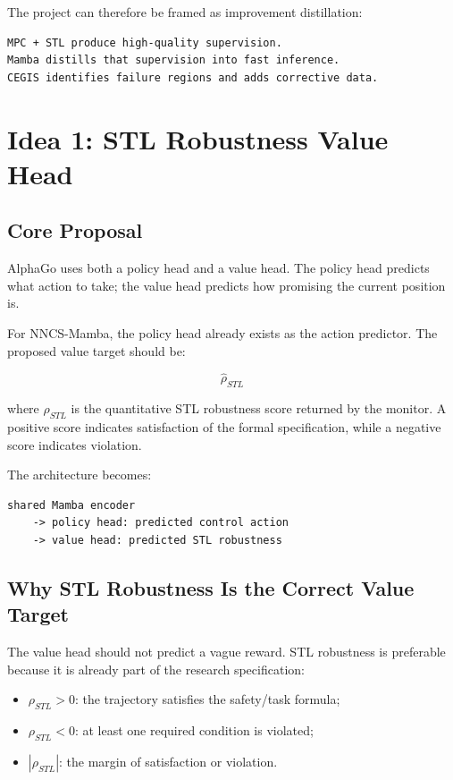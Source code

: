 \documentclass[11pt]{article}
\begin{document}
The project can therefore be framed as improvement distillation:

\begin{lstlisting}
MPC + STL produce high-quality supervision.
Mamba distills that supervision into fast inference.
CEGIS identifies failure regions and adds corrective data.
\end{lstlisting}

\section{Idea 1: STL Robustness Value Head}

\subsection{Core Proposal}

AlphaGo uses both a policy head and a value head. The policy head predicts what action to take; the value head predicts how promising the current position is.

For NNCS-Mamba, the policy head already exists as the action predictor. The proposed value target should be:

\[
\hat{\rho}_{STL}
\]

where \(\rho_{STL}\) is the quantitative STL robustness score returned by the monitor. A positive score indicates satisfaction of the formal specification, while a negative score indicates violation.

The architecture becomes:

\begin{lstlisting}
shared Mamba encoder
    -> policy head: predicted control action
    -> value head: predicted STL robustness
\end{lstlisting}

\subsection{Why STL Robustness Is the Correct Value Target}

The value head should not predict a vague reward. STL robustness is preferable because it is already part of the research specification:

\begin{itemize}
  \item \(\rho_{STL} > 0\): the trajectory satisfies the safety/task formula;
  \item \(\rho_{STL} < 0\): at least one required condition is violated;
  \item \(|\rho_{STL}|\): the margin of satisfaction or violation.
\end{itemize}
\end{document}
